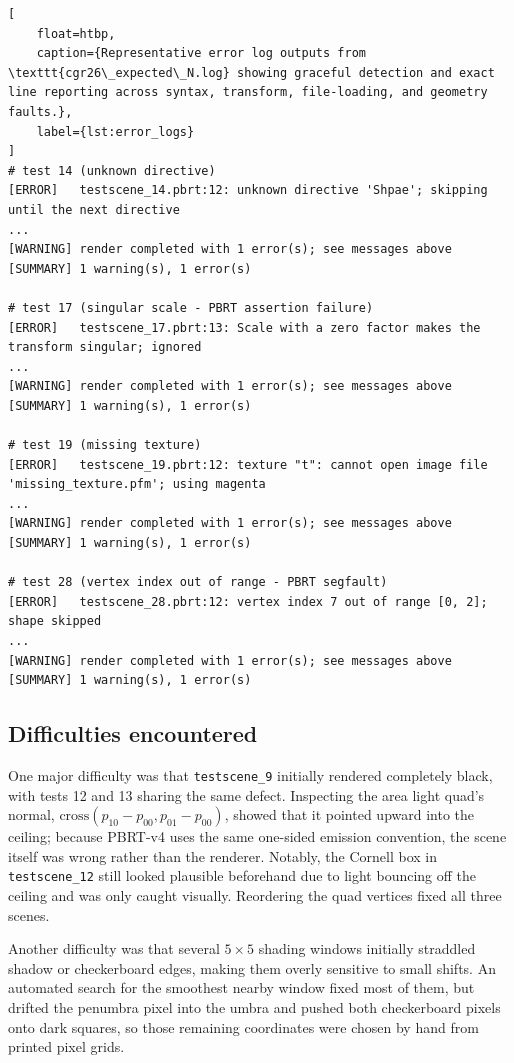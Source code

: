 \documentclass{article}
\begin{document}
\begin{lstlisting}[
    float=htbp,
    caption={Representative error log outputs from \texttt{cgr26\_expected\_N.log} showing graceful detection and exact line reporting across syntax, transform, file-loading, and geometry faults.},
    label={lst:error_logs}
]
# test 14 (unknown directive)
[ERROR]   testscene_14.pbrt:12: unknown directive 'Shpae'; skipping until the next directive
...
[WARNING] render completed with 1 error(s); see messages above
[SUMMARY] 1 warning(s), 1 error(s)

# test 17 (singular scale - PBRT assertion failure)
[ERROR]   testscene_17.pbrt:13: Scale with a zero factor makes the transform singular; ignored
...
[WARNING] render completed with 1 error(s); see messages above
[SUMMARY] 1 warning(s), 1 error(s)

# test 19 (missing texture)
[ERROR]   testscene_19.pbrt:12: texture "t": cannot open image file 'missing_texture.pfm'; using magenta
...
[WARNING] render completed with 1 error(s); see messages above
[SUMMARY] 1 warning(s), 1 error(s)

# test 28 (vertex index out of range - PBRT segfault)
[ERROR]   testscene_28.pbrt:12: vertex index 7 out of range [0, 2]; shape skipped
...
[WARNING] render completed with 1 error(s); see messages above
[SUMMARY] 1 warning(s), 1 error(s)
\end{lstlisting}

\subsection{Difficulties encountered}
One major difficulty was that \verb|testscene_9| initially rendered completely black, with tests 12 and 13 sharing the same defect. Inspecting the area light quad's normal, $\mathrm{cross}(p_{10} - p_{00}, p_{01} - p_{00})$, showed that it pointed upward into the ceiling; because PBRT-v4 uses the same one-sided emission convention, the scene itself was wrong rather than the renderer. Notably, the Cornell box in \verb|testscene_12| still looked plausible beforehand due to light bouncing off the ceiling and was only caught visually. Reordering the quad vertices fixed all three scenes.

Another difficulty was that several $5 \times 5$ shading windows initially straddled shadow or checkerboard edges, making them overly sensitive to small shifts. An automated search for the smoothest nearby window fixed most of them, but drifted the penumbra pixel into the umbra and pushed both checkerboard pixels onto dark squares, so those remaining coordinates were chosen by hand from printed pixel grids.
\end{document}
